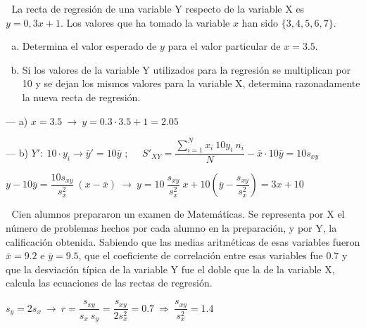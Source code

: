 \vspace{5mm} %
\begin{ejemplo}
\begin{ejer}\textcolor{white}{.}
	La recta de regresión de una variable Y respecto de la variable X es $y = 0,3x + 1$. Los valores que ha tomado la variable $x$ han sido $\{3, 4, 5, 6, 7\}$.
	
\begin{adjustwidth}{20pt}{10pt}
 \begin{enumerate}[a) ]
 	\item Determina el valor esperado de $y$ para el valor particular de $x = 3.5$.
 	\item Si los valores de la variable Y utilizados para la regresión se multiplican por 10 y se dejan los mismos valores para la variable X, determina razonadamente la nueva recta de regresión.
 \end{enumerate}
 \end{adjustwidth}
	
\end{ejer}
\end{ejemplo}

--- a) $x=3.5 \ \to \ y=0.3\cdot 3.5+1=2.05$

--- b) $Y':\ 10\cdot y_i \to \bar y'=10 \bar y$
$;\quad$
$S'_{XY}=	\dfrac {\displaystyle \sum_{i=1}^N x_i \ 10 y_i \ n_i}{N}-\bar x \cdot 10 \bar y = 10 s_{xy}$

$ y - 10 \bar y= \dfrac {10 s_{xy}}{s_x^2}\ (x-\bar x) \ \to \ 
y=10\ \dfrac{s_{xy}}{s_x^2} \ x+ 10 \left(\bar y - \dfrac {s_{xy}}{s_x^2} \right) =3x+10$


\vspace{5mm} %
\begin{ejemplo}
\begin{ejer}\textcolor{white}{.}
	Cien alumnos prepararon un examen de Matemáticas. Se representa por X el número de problemas hechos por cada alumno en la preparación, y por Y, la calificación obtenida. Sabiendo que las medias aritméticas de esas variables fueron $\bar x= 9.2$ e $\bar y= 9.5$, que el coeficiente de correlación entre esas variables fue $0.7$ y que la desviación típica de la variable Y fue el doble que la de la variable X, calcula las ecuaciones de las rectas de regresión.
\end{ejer}
\end{ejemplo}

$s_y=2s_x \ \to \ r=\dfrac{s_{xy}}{s_x\ s_y}= \dfrac{s_{xy}}{2 s_x^2}=0.7 \ \Rightarrow \ \dfrac{s_{xy}}{s_x^2}=1.4$


